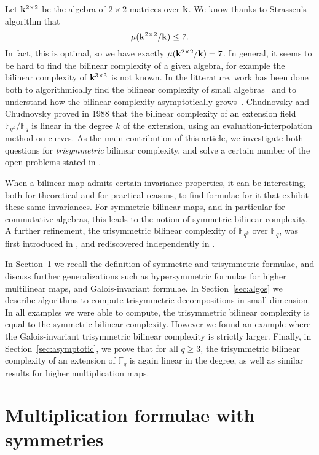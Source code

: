 \documentclass[11pt]{article}
\begin{document}
Let $\mathbf{k}^{2\times2}$ be the algebra
of $2\times2$ matrices over $\mathbf{k}$. We know thanks to Strassen's algorithm that 
\[
  \mu(\mathbf{k}^{2\times 2}/\mathbf{k}) \leq 7.
\]
In fact, this is optimal, so we have exactly $\mu(\mathbf{k}^{2\times2}/\mathbf{k})=7$. In
general, it seems to be hard to find the bilinear complexity of a given algebra,
for example the bilinear complexity of $\mathbf{k}^{3\times3}$ is not known.
In the litterature, work has been done both to algorithmically find the bilinear complexity of
small algebras~\cite{BDEZ12, Covanov19} and to understand how the bilinear
complexity asymptotically grows~\cite{CC88, BCPRRR19}. Chudnovsky and Chudnovsky
proved in 1988 that the bilinear complexity of an extension field
$\mathbb{F}_{q^k}/\mathbb{F}_{q}$ is linear in the degree $k$ of the
extension, using an evaluation-interpolation method on curves.
As the main contribution of this article, we
investigate both questions for \emph{trisymmetric} bilinear complexity,
and solve a certain number of the open problems stated in \cite[\S5.2]{BCPRRR19}.

When a bilinear map admits certain invariance properties, it can be interesting,
both for theoretical and for practical reasons,
to find formulae for it that exhibit these same invariances.
For symmetric bilinear maps, and in particular for commutative algebras, this leads to the notion of symmetric bilinear complexity.
A further refinement, the trisymmetric bilinear complexity of $\mathbb{F}_{q^k}$ over $\mathbb{F}_{q}$, was first introduced in \cite{SL84}, and rediscovered independently in \cite[App.~A]{Randriam15}.

In Section~\ref{sec:symtrisym} we recall the definition of symmetric and trisymmetric formulae, and discuss further generalizations such as hypersymmetric formulae for higher multilinear maps,
and Galois-invariant formulae. In Section~\ref{sec:algos} we
describe algorithms to compute trisymmetric decompositions in small dimension.
In all examples we were able to compute, the trisymmetric bilinear complexity is equal to the symmetric bilinear
complexity. However we found an example where the Galois-invariant trisymmetric bilinear complexity is strictly larger.
Finally, in
Section~\ref{sec:asymptotic}, we prove that for all $q\geq3$, the trisymmetric bilinear
complexity of an extension of $\mathbb{F}_q$ is again linear in the degree, as well as similar results
for higher multiplication maps.

\section{Multiplication formulae with symmetries}
\label{sec:symtrisym}
\end{document}
